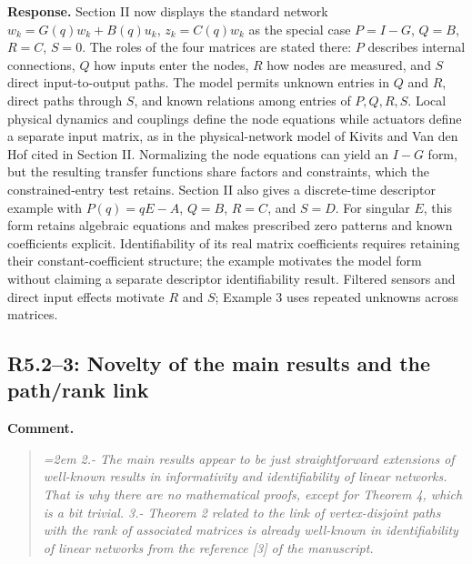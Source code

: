 \documentclass[11pt]{article}
\begin{document}
\textbf{Response.} Section II now displays the standard network
$w_k=G(q)w_k+B(q)u_k$, $z_k=C(q)w_k$ as the special case $P=I-G$,
$Q=B$, $R=C$, $S=0$. The roles of the four matrices are stated there:
$P$ describes internal connections, $Q$ how inputs enter the nodes, $R$ how
nodes are measured, and $S$ direct input-to-output paths. The model permits
unknown entries in $Q$ and $R$, direct paths through $S$, and known relations
among entries of $P,Q,R,S$. Local physical dynamics
and couplings define the node equations while actuators define a separate
input matrix, as in the
physical-network model of Kivits and Van den Hof cited in Section II.
Normalizing the node equations can yield an $I-G$ form, but the resulting
transfer functions share factors and constraints, which the constrained-entry test
retains. Section II also gives a discrete-time descriptor example with
$P(q)=qE-A$, $Q=B$, $R=C$, and $S=D$. For singular $E$, this form
retains algebraic equations and makes prescribed zero patterns and known
coefficients explicit. Identifiability of its real matrix coefficients
requires retaining their constant-coefficient structure; the example
motivates the model form without claiming a separate descriptor
identifiability result. Filtered sensors and direct input effects
motivate $R$ and $S$; Example 3 uses repeated unknowns across matrices.

\subsection*{R5.2--3: Novelty of the main results and the path/rank link}
\textbf{Comment.}
\begin{quote}\itshape\emergencystretch=2em
2.- The main results appear to be just straightforward extensions of well-known results in informativity and identifiability of linear networks. That is why there are no mathematical proofs, except for Theorem 4, which is a bit trivial. 3.- Theorem 2 related to the link of vertex-disjoint paths with the rank of associated matrices is already well-known in identifiability of linear networks from the reference [3] of the manuscript.
\end{quote}
\end{document}
